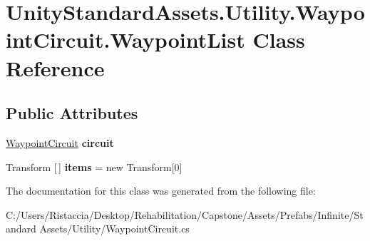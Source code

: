 \hypertarget{class_unity_standard_assets_1_1_utility_1_1_waypoint_circuit_1_1_waypoint_list}{}\section{Unity\+Standard\+Assets.\+Utility.\+Waypoint\+Circuit.\+Waypoint\+List Class Reference}
\label{class_unity_standard_assets_1_1_utility_1_1_waypoint_circuit_1_1_waypoint_list}
\subsection*{Public Attributes}
\begin{DoxyCompactItemize}
\item 
\mbox{\label{class_unity_standard_assets_1_1_utility_1_1_waypoint_circuit_1_1_waypoint_list_a8a024d382de1b36d054562f150533035}} 
\hyperlink{class_unity_standard_assets_1_1_utility_1_1_waypoint_circuit}{Waypoint\+Circuit} {\bfseries circuit}
\item 
\mbox{\label{class_unity_standard_assets_1_1_utility_1_1_waypoint_circuit_1_1_waypoint_list_af44d62dad0eb5964ba20ec2b9a39372f}} 
Transform \mbox{[}$\,$\mbox{]} {\bfseries items} = new Transform\mbox{[}0\mbox{]}
\end{DoxyCompactItemize}


The documentation for this class was generated from the following file\+:\begin{DoxyCompactItemize}
\item 
C\+:/\+Users/\+Ristaccia/\+Desktop/\+Rehabilitation/\+Capstone/\+Assets/\+Prefabs/\+Infinite/\+Standard Assets/\+Utility/Waypoint\+Circuit.\+cs\end{DoxyCompactItemize}
